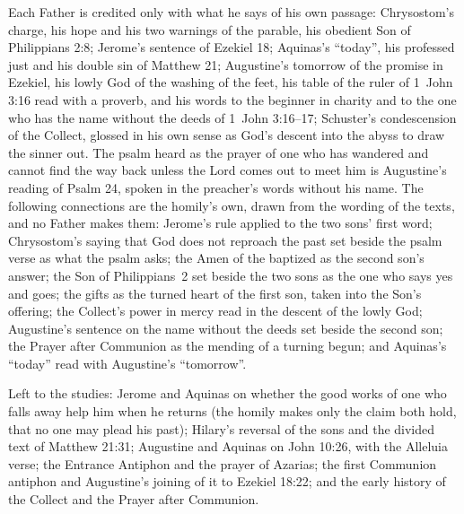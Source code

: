 {Each Father is credited only with what he says of his own passage:
Chrysostom's charge, his hope and his two warnings of the parable, his
obedient Son of Philippians 2:8; Jerome's sentence of Ezekiel 18; Aquinas's
``today'', his professed just and his double sin of Matthew 21; Augustine's
tomorrow of the promise in Ezekiel, his lowly God of the washing of the feet,
his table of the ruler of 1~John 3:16 read with a proverb, and his words to
the beginner in charity and to the one who has the name without the deeds of
1~John 3:16--17; Schuster's condescension of the Collect, glossed in his own
sense as God's descent into the abyss to draw the sinner out. The psalm heard
as the prayer of one who has wandered and cannot find the way back unless the
Lord comes out to meet him is Augustine's reading of Psalm 24, spoken in the
preacher's words without his name. The following connections are the
homily's own, drawn from the wording of the texts, and no Father makes them:
Jerome's rule applied to the two sons' first word; Chrysostom's saying that
God does not reproach the past set beside the psalm verse as what the psalm
asks; the Amen of the baptized as the second son's answer; the Son of
Philippians~2 set beside the two sons as the one who says yes and goes; the
gifts as the turned heart of the first son, taken into the Son's offering;
the Collect's power in mercy read in the descent of the lowly God;
Augustine's sentence on the name without the deeds set beside the second son;
the Prayer after Communion as the mending of a turning begun; and Aquinas's
``today'' read with Augustine's ``tomorrow''.

Left to the studies: Jerome and Aquinas on whether the good works of one who
falls away help him when he returns (the homily makes only the claim both
hold, that no one may plead his past); Hilary's reversal of the sons and the
divided text of Matthew 21:31; Augustine and Aquinas on John 10:26, with the
Alleluia verse; the Entrance Antiphon and the prayer of Azarias; the first
Communion antiphon and Augustine's joining of it to Ezekiel 18:22; and the
early history of the Collect and the Prayer after Communion.

}
